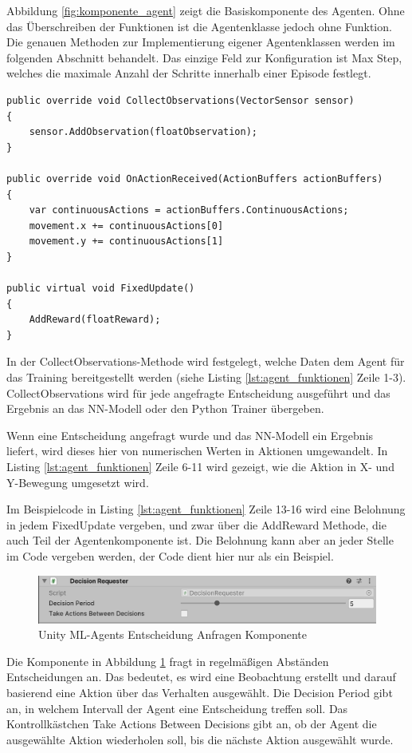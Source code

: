 Abbildung \ref{fig:komponente_agent} zeigt die Basiskomponente des Agenten. Ohne das Überschreiben der Funktionen ist die Agentenklasse jedoch ohne Funktion. Die genauen Methoden zur Implementierung eigener Agentenklassen werden im folgenden Abschnitt behandelt. Das einzige Feld zur Konfiguration ist \grqq{}Max Step\grqq{}, welches die maximale Anzahl der Schritte innerhalb einer Episode festlegt.

\begin{lstlisting}[caption={Agent Funktionen},captionpos=b,label={lst:agent_funktionen}]
public override void CollectObservations(VectorSensor sensor)
{
    sensor.AddObservation(floatObservation);
}

public override void OnActionReceived(ActionBuffers actionBuffers)
{
    var continuousActions = actionBuffers.ContinuousActions;
    movement.x += continuousActions[0]
    movement.y += continuousActions[1]
}

public virtual void FixedUpdate()
{
    AddReward(floatReward);
}
\end{lstlisting}

In der CollectObservations-Methode wird festgelegt, welche Daten dem Agent für das Training bereitgestellt werden (siehe Listing \ref{lst:agent_funktionen} Zeile 1-3). CollectObservations wird für jede angefragte Entscheidung ausgeführt und das Ergebnis an das NN-Modell oder den Python Trainer übergeben.

Wenn eine Entscheidung angefragt wurde und das NN-Modell ein Ergebnis liefert, wird dieses hier von numerischen Werten in Aktionen umgewandelt. In Listing \ref{lst:agent_funktionen} Zeile 6-11 wird gezeigt, wie die Aktion in X- und Y-Bewegung umgesetzt wird.

Im Beispielcode in Listing \ref{lst:agent_funktionen} Zeile 13-16 wird eine Belohnung in jedem FixedUpdate vergeben, und zwar über die AddReward Methode, die auch Teil der Agentenkomponente ist. Die Belohnung kann aber an jeder Stelle im Code vergeben werden, der Code dient hier nur als ein Beispiel.

\begin{figure}[H]
  \centering  
  \includegraphics[scale=0.5]{img/komponente_decision_requester.png}
  \caption{Unity ML-Agents Entscheidung Anfragen Komponente}
  \label{fig:komponente_decision_requester}
\end{figure}

Die Komponente in Abbildung \ref{fig:komponente_decision_requester} fragt in regelmäßigen Abständen Entscheidungen an. Das bedeutet, es wird eine Beobachtung erstellt und darauf basierend eine Aktion über das Verhalten ausgewählt. Die \grqq{}Decision Period\grqq{} gibt an, in welchem Intervall der Agent eine Entscheidung treffen soll. Das Kontrollkästchen \grqq{}Take Actions Between Decisions\grqq{} gibt an, ob der Agent die ausgewählte Aktion wiederholen soll, bis die nächste Aktion ausgewählt wurde.